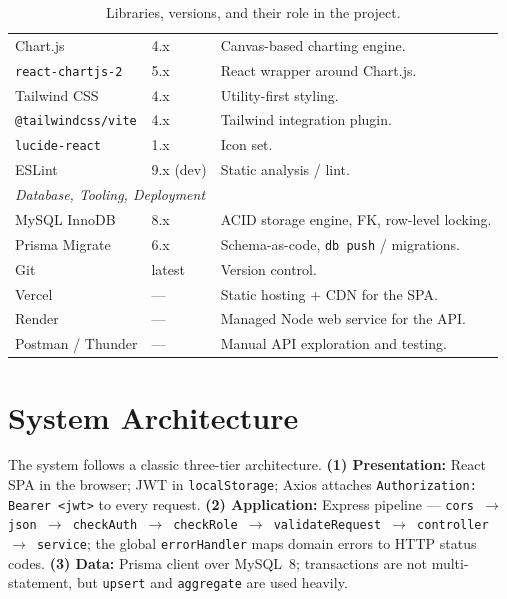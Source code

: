 \documentclass[11pt,a4paper]{article}
\newcommand{\code}[1]{\texttt{\small #1}}
\begin{document}
\begin{table}[htbp]
\begin{tabularx}{\textwidth}{l l X}
Chart.js             & 4.x             & Canvas-based charting engine. \\
\code{react-chartjs-2} & 5.x           & React wrapper around Chart.js. \\
Tailwind CSS         & 4.x             & Utility-first styling. \\
\code{@tailwindcss/vite} & 4.x         & Tailwind integration plugin. \\
\code{lucide-react}  & 1.x             & Icon set. \\
ESLint               & 9.x (dev)       & Static analysis / lint. \\
\midrule
\multicolumn{3}{l}{\textit{Database, Tooling, Deployment}}\\
MySQL InnoDB         & 8.x             & ACID storage engine, FK, row-level locking. \\
Prisma Migrate       & 6.x             & Schema-as-code, \code{db push} / migrations. \\
Git                  & latest          & Version control. \\
Vercel               & ---             & Static hosting + CDN for the SPA. \\
Render               & ---             & Managed Node web service for the API. \\
Postman / Thunder    & ---             & Manual API exploration and testing. \\
\bottomrule
\end{tabularx}
\caption{Libraries, versions, and their role in the project.}
\label{tab:libs}
\end{table}

\section{System Architecture}
The system follows a classic three-tier architecture.
\textbf{(1) Presentation:} React SPA in the browser; JWT in
\code{localStorage}; Axios attaches \code{Authorization: Bearer <jwt>}
to every request. \textbf{(2) Application:} Express pipeline ---
\code{cors $\rightarrow$ json $\rightarrow$ checkAuth $\rightarrow$
checkRole $\rightarrow$ validateRequest $\rightarrow$ controller
$\rightarrow$ service}; the global \code{errorHandler} maps domain
errors to HTTP status codes. \textbf{(3) Data:} Prisma client over
MySQL~8; transactions are not multi-statement, but \code{upsert} and
\code{aggregate} are used heavily.
\end{document}

